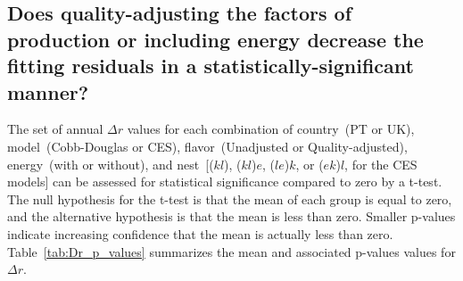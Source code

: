 \documentclass[preprint,authoryear,12pt]{elsarticle}\usepackage[]{graphicx}\usepackage[]{color}
\begin{document}
\subsection{Does quality-adjusting the factors of production or including energy
            decrease the fitting residuals in a statistically-significant manner?} 
\label{sec:quality_adj_energy_and_fitting_residual}

The set of annual $\Delta r$ values for each combination of 
country~(PT or UK), 
model~(Cobb-Douglas or CES),
flavor~(Unadjusted or Quality-adjusted), 
energy~(with or without), and
nest~[($kl$), ($kl$)$e$, ($le$)$k$, or ($ek$)$l$, for the CES models]
can be assessed for statistical significance
compared to zero by a t-test.
The null hypothesis for the t-test is that the mean of each group is
equal to zero, and 
the alternative hypothesis is that the mean is less than zero.
Smaller p-values indicate increasing confidence that the 
mean is actually less than zero.
Table~\ref{tab:Dr_p_values} summarizes the mean 
and associated p-values values for $\Delta r$.
%
\end{document}
